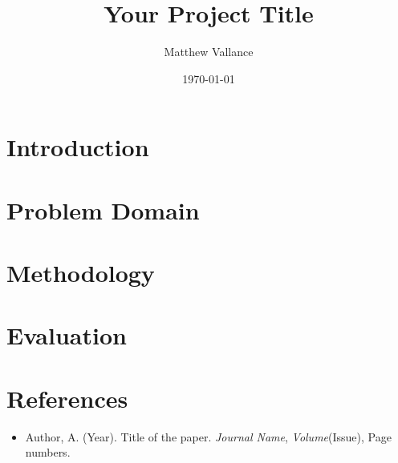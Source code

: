 \documentclass{article}
\begin{document}
\title{Your Project Title}
\author{Matthew Vallance}
\date{\today}

\maketitle

\section{Introduction}

\section{Problem Domain}

\section{Methodology}

\section{Evaluation}

\section{References}
\begin{itemize}
    \item Author, A. (Year). Title of the paper. \textit{Journal Name}, \textit{Volume}(Issue), Page numbers.
\end{itemize}
\end{document}
